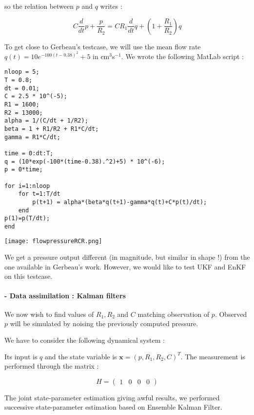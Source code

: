 \documentclass[a4paper]{article}
\begin{document}
\noindent so the relation between $p$ and $q$ writes :

$$C\frac d{dt}p+\frac p{R_2}=CR_1\frac d{dt}q+\left(1+\frac{R_1}{R_2}\right)q$$

To get close to Gerbeau's testcase, we will use the mean flow rate $q(t)=10e^{-100(t-0.38)^2}+5$ in cm$^3$s$^{-1}$. We wrote the following MatLab script :

\begin{verbatim}
nloop = 5;
T = 0.8;
dt = 0.01;
C = 2.5 * 10^(-5);
R1 = 1600;
R2 = 13000;
alpha = 1/(C/dt + 1/R2);
beta = 1 + R1/R2 + R1*C/dt;
gamma = R1*C/dt;

time = 0:dt:T;
q = (10*exp(-100*(time-0.38).^2)+5) * 10^(-6);
p = 0*time;

for i=1:nloop
    for t=1:T/dt
        p(t+1) = alpha*(beta*q(t+1)-gamma*q(t)+C*p(t)/dt);
    end
p(1)=p(T/dt);
end
\end{verbatim}


\begin{center}
\texttt{[image: flowpressureRCR.png]}
\end{center}

We get a pressure output different (in magnitude, but similar in shape !) from the one available in Gerbeau's work. However, we would like to test UKF and EnKF on this testcase.



\setcounter{d}{0}
\setcounter{e}{0}
\setcounter{d}{0}
\setcounter{r}{0}
\paragraph{ - Data assimilation : Kalman filters}

We now wish to find values of $R_1,R_2$ and $C$ matching observation of $p$. Observed $p$ will be simulated by noising the previously computed pressure.


We have to consider the following dynamical system :


\noindent Its input is $q$ and the state variable is $\mathbf x=(p,R_1,R_2,C)^T$. The measurement is performed through the matrix :

$$H=\left(\begin{array}{cccc}1&0&0&0\end{array}\right)$$

The joint state-parameter estimation giving awful results, we performed successive state-parameter estimation based on Ensemble Kalman Filter.
\end{document}
